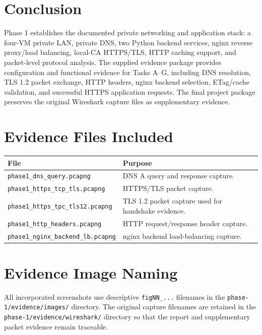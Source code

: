 \documentclass[12pt,a4paper]{article}
\begin{document}
\section{Conclusion}
Phase 1 establishes the documented private networking and application stack: a four-VM private LAN, private DNS, two Python backend services, nginx reverse proxy/load balancing, local-CA HTTPS/TLS, HTTP caching support, and packet-level protocol analysis. The supplied evidence package provides configuration and functional evidence for Tasks A--G, including DNS resolution, TLS 1.2 packet exchange, HTTP headers, nginx backend selection, ETag/cache validation, and successful HTTPS application requests. The final project package preserves the original Wireshark capture files as supplementary evidence.

\appendix
\section{Evidence Files Included}
\begin{tabularx}{\textwidth}{lX}
\toprule
\textbf{File} & \textbf{Purpose}\\
\midrule
\texttt{phase1\_dns\_query.pcapng} & DNS A query and response capture.\\
\texttt{phase1\_https\_tcp\_tls.pcapng} & HTTPS/TLS packet capture.\\
\texttt{phase1\_https\_tpc\_tls12.pcapng} & TLS 1.2 packet capture used for handshake evidence.\\
\texttt{phase1\_http\_headers.pcapng} & HTTP request/response header capture.\\
\texttt{phase1\_nginx\_backend\_lb.pcapng} & nginx backend load-balancing capture.\\
\bottomrule
\end{tabularx}

\section{Evidence Image Naming}
All incorporated screenshots use descriptive \texttt{figNN\_...} filenames in the \texttt{phase-1/evidence/images/} directory. The original capture filenames are retained in the \texttt{phase-1/evidence/wireshark/} directory so that the report and supplementary packet evidence remain traceable.
\end{document}
